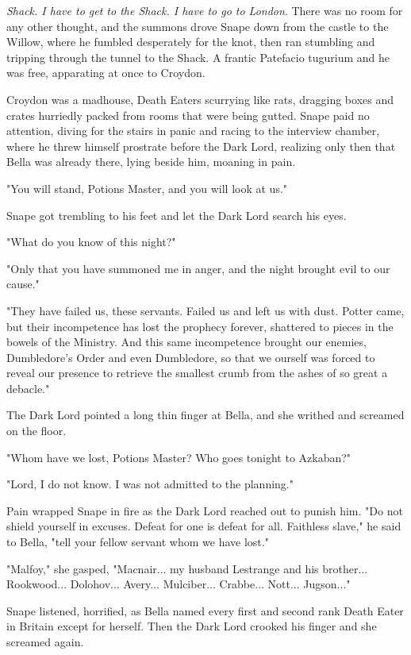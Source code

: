 \documentclass[a4paper,11pt]{article}
\begin{document}
\emph{Shack. I have to get to the Shack. I have to go to London}. There was no room for any other thought, and the summons drove Snape down from the castle to the Willow, where he fumbled desperately for the knot, then ran stumbling and tripping through the tunnel to the Shack. A frantic Patefacio tugurium and he was free, apparating at once to Croydon.

Croydon was a madhouse, Death Eaters scurrying like rats, dragging boxes and crates hurriedly packed from rooms that were being gutted. Snape paid no attention, diving for the stairs in panic and racing to the interview chamber, where he threw himself prostrate before the Dark Lord, realizing only then that Bella was already there, lying beside him, moaning in pain.

"You will stand, Potions Master, and you will look at us."

Snape got trembling to his feet and let the Dark Lord search his eyes.

"What do you know of this night?"

"Only that you have summoned me in anger, and the night brought evil to our cause."

"They have failed us, these servants. Failed us and left us with dust. Potter came, but their incompetence has lost the prophecy forever, shattered to pieces in the bowels of the Ministry. And this same incompetence brought our enemies, Dumbledore's Order and even Dumbledore, so that we ourself was forced to reveal our presence to retrieve the smallest crumb from the ashes of so great a debacle."

The Dark Lord pointed a long thin finger at Bella, and she writhed and screamed on the floor.

"Whom have we lost, Potions Master? Who goes tonight to Azkaban?"

"Lord, I do not know. I was not admitted to the planning."

Pain wrapped Snape in fire as the Dark Lord reached out to punish him. "Do not shield yourself in excuses. Defeat for one is defeat for all. Faithless slave," he said to Bella, "tell your fellow servant whom we have lost."

"Malfoy," she gasped, "Macnair... my husband Lestrange and his brother... Rookwood... Dolohov... Avery... Mulciber... Crabbe... Nott... Jugson..."

Snape listened, horrified, as Bella named every first and second rank Death Eater in Britain except for herself. Then the Dark Lord crooked his finger and she screamed again.
\end{document}

